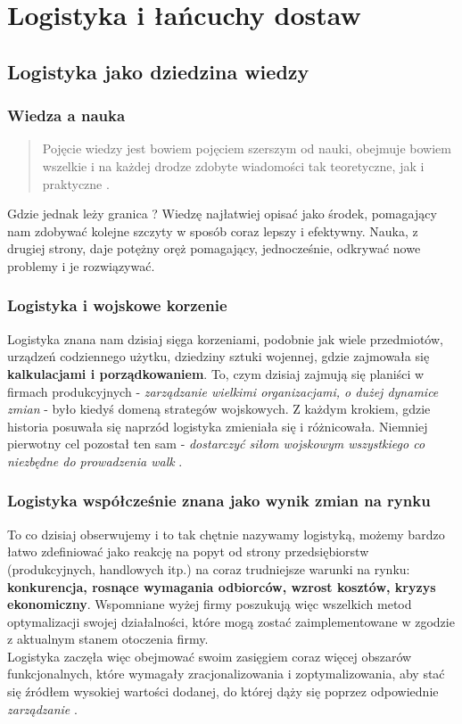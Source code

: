 \chapter{Logistyka i łańcuchy dostaw}
\label{c2:c2}

\section{Logistyka jako dziedzina wiedzy}
	\subsection{Wiedza a nauka}	
		\begin{quote}
			Pojęcie wiedzy jest bowiem pojęciem szerszym od nauki,
			obejmuje bowiem wszelkie i na każdej drodze zdobyte wiadomości
			tak teoretyczne, jak i praktyczne \cite{organizacja_badan_ocen_prac_naukowych}.
		\end{quote}
		Gdzie jednak leży granica ? Wiedzę najłatwiej opisać jako środek, pomagający 
		nam zdobywać kolejne szczyty w sposób coraz lepszy i efektywny. Nauka, z drugiej strony,
		daje potężny oręż pomagający, jednocześnie, odkrywać nowe problemy i je rozwiązywać.
	\subsection{Logistyka i wojskowe korzenie}
		Logistyka znana nam dzisiaj sięga korzeniami, podobnie jak wiele przedmiotów, urządzeń 
		codziennego użytku, dziedziny sztuki wojennej, gdzie zajmowała się \textbf{kalkulacjami i porządkowaniem}.
		To, czym dzisiaj zajmują się planiści w firmach produkcyjnych - \emph{zarządzanie wielkimi organizacjami,
		o dużej dynamice zmian} - było kiedyś domeną strategów wojskowych. Z każdym krokiem, gdzie historia posuwała
		się naprzód logistyka zmieniała się i różnicowała. Niemniej pierwotny cel pozostał ten sam - 
		\emph{dostarczyć siłom wojskowym wszystkiego co niezbędne do prowadzenia walk} \cite{logistyka_jako_dziedzina_wiedzy_cz1}.
	\subsection{Logistyka współcześnie znana jako wynik zmian na rynku}
		To co dzisiaj obserwujemy i to tak chętnie nazywamy logistyką, 
		możemy bardzo łatwo zdefiniować jako reakcję na popyt od
		strony przedsiębiorstw (produkcyjnych, handlowych itp.) na coraz trudniejsze warunki na
		rynku: \textbf{konkurencja, rosnące wymagania odbiorców, wzrost kosztów, kryzys ekonomiczny}.
		Wspomniane wyżej firmy poszukują więc wszelkich metod optymalizacji swojej działalności, 
		które mogą zostać zaimplementowane w zgodzie z aktualnym stanem otoczenia firmy.\\
		Logistyka zaczęła więc obejmować swoim zasięgiem coraz więcej obszarów funkcjonalnych, które
		wymagały zracjonalizowania i zoptymalizowania, aby stać się źródłem wysokiej wartości dodanej, do której
		dąży się poprzez odpowiednie \emph{zarządzanie} \cite{logistyka_jako_dziedzina_wiedzy_cz1}.
